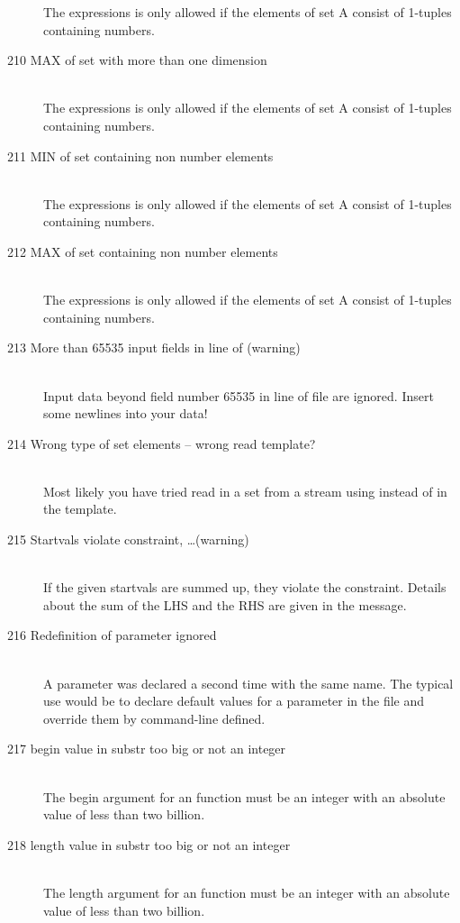 \begin{description}
   The expressions  is only allowed if the elements of 
   set A consist of 1-tuples containing numbers.  
\item[210 MAX of set with more than one dimension]\ \\
   The expressions  is only allowed if the elements of 
   set A consist of 1-tuples containing numbers.  
\item[211 MIN of set containing non number elements]\ \\
   The expressions  is only allowed if the elements of 
   set A consist of 1-tuples containing numbers.  
\item[212 MAX of set containing non number elements]\ \\
   The expressions  is only allowed if the elements of 
   set A consist of 1-tuples containing numbers.  
\item[213 More than 65535 input fields in line \code{xxx} of
   \code{yyy} (warning)]\ \\
   Input data beyond field number 65535 in line  of file
    are ignored. Insert some newlines into your data!
\item[214 Wrong type of set elements -- wrong read template?]\ \\
   Most likely you have tried read in a set from a stream using
    instead of  in the template. 
\item[215 Startvals violate constraint, \ldots (warning)]\ \\
   If the given startvals are summed up, they violate the
   constraint. Details about the sum of the LHS and the RHS are given
   in the message.
\item[216 Redefinition of parameter \code{xxx} ignored]\ \\
   A parameter was declared a second time with the same name. The
   typical use would be to declare default values for a parameter in
   the \zimpl file and override them by command-line defined.
\item[217 begin value \code{xxx} in substr too big or not an integer]\ \\
   The begin argument for an  function
   must be an integer with an absolute value of less than two billion.
\item[218 length value \code{xxx} in substr too big or not an integer]\ \\
   The length argument for an  function
   must be an integer with an absolute value of less than two billion.

\end{description}
